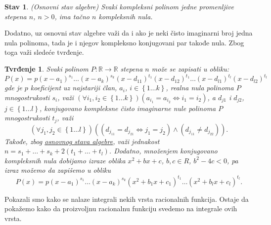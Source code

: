 \documentclass{article}
\newtheorem{stav}{Stav}[section]
\newtheorem{tvr}{Tvrđenje}[section]
\begin{document}
\begin{stavbox}
    \label{podsetnik_stava_1}
    \begin{stav}
        (Osnovni stav algebre) Svaki kompleksni polinom
        jedne promenljive stepena $n$, $n>0$, ima tačno
        $n$ kompleksnih nula.
    \end{stav}
\end{stavbox}

Dodatno, uz osnovni stav algebre važi da i ako je neki čisto imaginarni
broj jedna nula polinoma, tada je i njegov kompleksno konjugovani
par takođe nula. Zbog toga važi sledeće tvrđenje.

\begin{tvrbox}
    \label{tvrđenje_1.1}
    \begin{tvr}
        Svaki polinom $P:\mathbb{R}\longrightarrow\mathbb{R}$ stepena $n$
        može se zapisati u obliku:
        $$P\left(x\right)=p\left(x-a_1\right)^{s_1}\dotsc\left(x-a_k\right)^{s_k}\left(x-d_{11}\right)^{t_1}\left(x-d_{12}\right)^{t_1}\dotsc\left(x-d_{l1}\right)^{t_l}\left(x-d_{l2}\right)^{t_l}$$
        gde je $p$ koeficijent uz najstariji član,
        $a_i$, $i\in\left\{1\dotsc k\right\}$, realna nula polinoma $P$ mnogostrukosti $s_i$, važi $\left(\forall i_1,i_2\in\left\{1\dotsc k\right\}\right)\left(a_{i_1}=a_{i_2}\iff i_1=i_2\right)$,
        a $d_{j1}$ i $d_{j2}$,
        $j\in\left\{1\dotsc l\right\}$, konjugovano kompleksne čisto imaginarne nule polinoma $P$
        mnogostrukosti $t_j$, važi
        $$\left(\forall j_1,j_2\in\left\{1\dotsc l\right\}\right)\left(\left(d_{j_11}=d_{j_21}\iff j_1=j_2\right)\land\left(d_{j_11}\neq d_{j_22}\right)\right).$$
        Takođe, zbog \hyperref[podsetnik_stava_1]{osnovnog stava algebre}, važi jednakost $n=s_1+\dotsc+s_k+2\left(t_1+\dotsc+t_l\right)$. Dodatno,
        množenjem konjugovano kompleksnih nula dobijamo izraze oblika $x^2+bx+c$, $b,c\in{R}$, $b^2-4c<0$,
        pa izraz možemo da zapišemo u obliku
        $$P\left(x\right)=p\left(x-a_1\right)^{s_1}\dotsc\left(x-a_k\right)^{s_k}\left(x^2+b_1x+c_1\right)^{t_1}\dotsc\left(x^2+b_lx+c_l\right)^{t_l}.$$
    \end{tvr}
\end{tvrbox}

Pokazali smo kako se nalaze integrali nekih vrsta
racionalnih funkcija. Ostaje da pokažemo kako da
proizvoljnu racionalnu funkciju svedemo na
integrale ovih vrsta.
\end{document}
